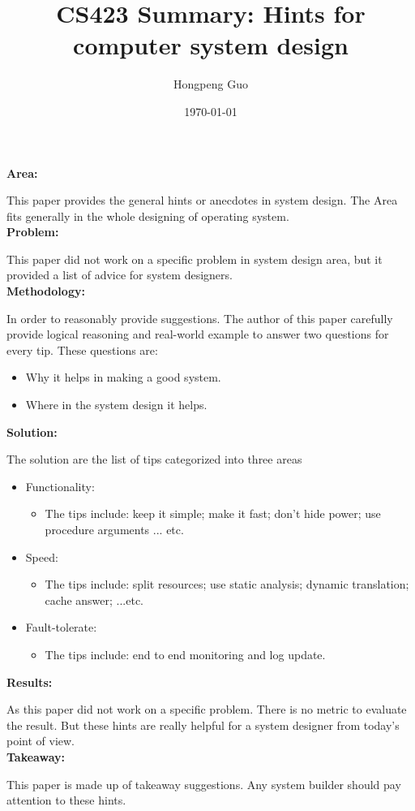 \documentclass[10pt]{article}
\title{CS423 Summary: Hints for computer system design}
\author{Hongpeng Guo}
\date{\today}
\begin{document}
\maketitle

\noindent
{\bf Area:}

This paper provides the general hints or anecdotes in system design. The Area fits generally in the whole designing of operating system.
\\

\noindent
{\bf Problem:}

This paper did not work on a specific problem in system design area, but it provided a list of advice for system designers. 
\\

\noindent
{\bf Methodology:}

In order to reasonably provide suggestions. The author of this paper carefully provide logical reasoning and real-world example to answer two questions for every tip. These questions are:
\begin{itemize}
\item
Why it helps in making a good system.
\item
Where in the system design it helps.
\end{itemize}

\noindent
{\bf Solution:}

The solution are the list of tips categorized into three areas
\begin{itemize}
\item
Functionality:
\begin{itemize}
\item 
The tips include: keep it simple; make it fast; don't hide power; use procedure arguments ... etc.
\end{itemize}

\item
Speed:
\begin{itemize}
\item
The tips include: split resources; use static analysis; dynamic translation; cache answer; ...etc.
\end{itemize}

\item
Fault-tolerate:
\begin{itemize}
\item 
The tips include: end to end monitoring and log update.
\end{itemize}
\end{itemize}
\noindent
{\bf Results:}

As this paper did not work on a specific problem. There is no metric to evaluate the result. But these hints are really helpful for a system designer from today's point of view.
\\

\noindent
{\bf Takeaway:}

This paper is made up of takeaway suggestions. Any system builder should pay attention to these hints.
\end{document}
